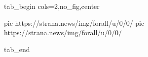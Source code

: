  
 
 
 
 


\ifcmt
  tab_begin cols=2,no_fig,center

     pic https://strana.news/img/forall/u/0/0/%
		 pic https://strana.news/img/forall/u/0/0/%

  tab_end
\fi
